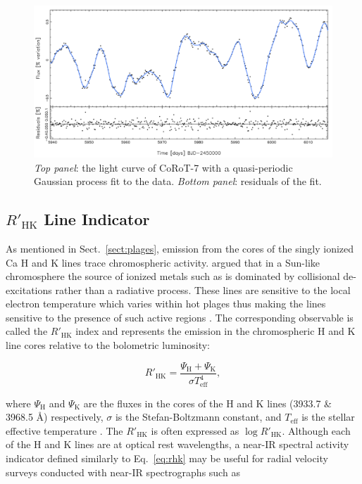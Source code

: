 \begin{figure}
\centering
\includegraphics[scale=.4]{figures/lcgp.png}
\caption{\emph{Top panel}: the light curve of CoRoT-7 with a quasi-periodic Gaussian process 
fit to the data. \emph{Bottom panel}: residuals of the fit. \parencite[Image credit:][]{haywood14} 
\label{fig:lcgp}}
\end{figure}

\subsection{$R'_\mathrm{HK}$ Line Indicator} \label{sect:indicator}
As mentioned in Sect.~\ref{sect:plages}, emission from the cores of the singly ionized Ca 
H and K lines trace chromospheric activity. 
\cite{thomas57} argued that in a Sun-like chromosphere the source of ionized metals such as 
\caii{} is dominated by collisional de-excitations rather than a 
radiative process. These lines are sensitive to the local electron temperature which varies 
within hot plages thus making the lines sensitive to the presence of such active regions 
\parencite{hall08}. The corresponding observable is called the $R'_{\mathrm{HK}}$ index and 
represents the emission in the chromospheric H and K line cores relative to the bolometric 
luminosity:

\begin{equation}
R'_{\mathrm{HK}} = \frac{\Psi_{\mathrm{H}} + \Psi_{\mathrm{K}}}{\sigma T_{\mathrm{eff}}^4},
\label{eq:rhk}
\end{equation}

\noindent where $\Psi_{\mathrm{H}}$ and $\Psi_{\mathrm{K}}$ are the fluxes in the cores of the 
H and K lines (3933.7 \& 3968.5 \AA) respectively, 
$\sigma$ is the Stefan-Boltzmann constant, and $T_{\mathrm{eff}}$ is the stellar effective 
temperature \parencite{martinez10}. The $R'_{\mathrm{HK}}$ is often expressed as $\log{R'_{\mathrm{HK}}}$. 
Although each of the H and K lines are at optical rest wavelengths, a near-IR 
spectral activity indicator defined similarly to Eq.~\ref{eq:rhk} may be useful for radial 
velocity surveys conducted with near-IR spectrographs such as 


